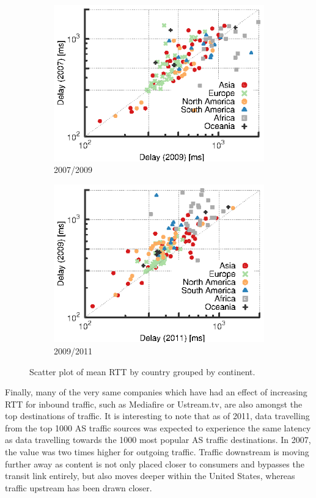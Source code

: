 \begin{figure}
    \centering
    \begin{subfigure}[b]{0.5\linewidth}
        \includegraphics{figures/malawi/rtt_comp_07_09}
        \caption{2007/2009}
    \end{subfigure}%
    \begin{subfigure}[b]{0.5\linewidth}
        \includegraphics{figures/malawi/rtt_comp_09_11}
        \caption{2009/2011}
    \end{subfigure}%
    \caption{Scatter plot of mean RTT by country grouped by continent.\label{fig:rtt_comp}}
\end{figure}

Finally, many of the very same companies which have had an effect of increasing \ac{RTT} for inbound traffic, such as Mediafire or Ustream.tv, are also amongst the top destinations of traffic. 
It is interesting to note that as of 2011, data travelling from the top 1000 \ac{AS} traffic sources was expected to experience the same latency as data travelling towards the 1000 most popular \ac{AS} traffic destinations. 
In 2007, the value was two times higher for outgoing traffic.
Traffic downstream is moving further away as content is not only placed closer to consumers and bypasses the transit link entirely, but also moves deeper within the United States, whereas traffic upstream has been drawn closer. 

